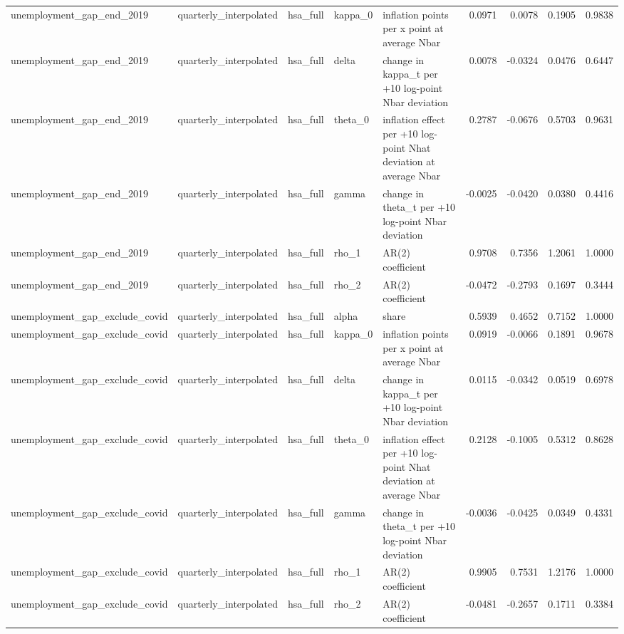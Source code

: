 \begin{tabular}{lllllrrrr}
unemployment\_gap\_end\_2019 & quarterly\_interpolated & hsa\_full & kappa\_0 & inflation points per x point at average Nbar & 0.0971 & 0.0078 & 0.1905 & 0.9838 \\
unemployment\_gap\_end\_2019 & quarterly\_interpolated & hsa\_full & delta & change in kappa\_t per +10 log-point Nbar deviation & 0.0078 & -0.0324 & 0.0476 & 0.6447 \\
unemployment\_gap\_end\_2019 & quarterly\_interpolated & hsa\_full & theta\_0 & inflation effect per +10 log-point Nhat deviation at average Nbar & 0.2787 & -0.0676 & 0.5703 & 0.9631 \\
unemployment\_gap\_end\_2019 & quarterly\_interpolated & hsa\_full & gamma & change in theta\_t per +10 log-point Nbar deviation & -0.0025 & -0.0420 & 0.0380 & 0.4416 \\
unemployment\_gap\_end\_2019 & quarterly\_interpolated & hsa\_full & rho\_1 & AR(2) coefficient & 0.9708 & 0.7356 & 1.2061 & 1.0000 \\
unemployment\_gap\_end\_2019 & quarterly\_interpolated & hsa\_full & rho\_2 & AR(2) coefficient & -0.0472 & -0.2793 & 0.1697 & 0.3444 \\
unemployment\_gap\_exclude\_covid & quarterly\_interpolated & hsa\_full & alpha & share & 0.5939 & 0.4652 & 0.7152 & 1.0000 \\
unemployment\_gap\_exclude\_covid & quarterly\_interpolated & hsa\_full & kappa\_0 & inflation points per x point at average Nbar & 0.0919 & -0.0066 & 0.1891 & 0.9678 \\
unemployment\_gap\_exclude\_covid & quarterly\_interpolated & hsa\_full & delta & change in kappa\_t per +10 log-point Nbar deviation & 0.0115 & -0.0342 & 0.0519 & 0.6978 \\
unemployment\_gap\_exclude\_covid & quarterly\_interpolated & hsa\_full & theta\_0 & inflation effect per +10 log-point Nhat deviation at average Nbar & 0.2128 & -0.1005 & 0.5312 & 0.8628 \\
unemployment\_gap\_exclude\_covid & quarterly\_interpolated & hsa\_full & gamma & change in theta\_t per +10 log-point Nbar deviation & -0.0036 & -0.0425 & 0.0349 & 0.4331 \\
unemployment\_gap\_exclude\_covid & quarterly\_interpolated & hsa\_full & rho\_1 & AR(2) coefficient & 0.9905 & 0.7531 & 1.2176 & 1.0000 \\
unemployment\_gap\_exclude\_covid & quarterly\_interpolated & hsa\_full & rho\_2 & AR(2) coefficient & -0.0481 & -0.2657 & 0.1711 & 0.3384 \\

\end{tabular}
